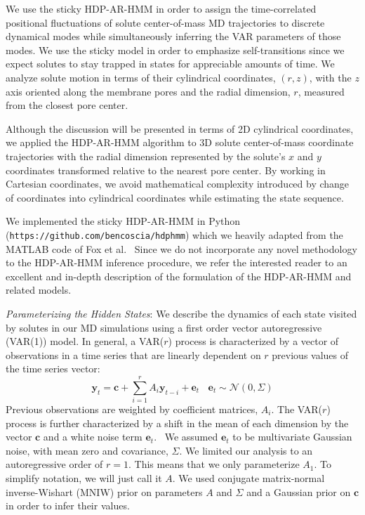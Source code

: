 \documentclass[journal=jpcbfk,manuscript=article]{achemso}
\begin{document}
  We use the sticky HDP-AR-HMM in order to assign the time-correlated positional 
  fluctuations of solute center-of-mass MD trajectories to discrete dynamical modes while 
  simultaneously inferring the VAR parameters of those modes. We use the sticky model
  in order to emphasize self-transitions since we expect solutes to stay trapped in
  states for appreciable amounts of time. We analyze solute motion in terms of their
  cylindrical coordinates, $(r, z)$, with the $z$ axis oriented along the membrane 
  pores and the radial dimension, $r$, measured from the closest pore center. 
  
  Although the discussion will be presented in terms of 2D cylindrical coordinates, we
  applied the HDP-AR-HMM algorithm to 3D solute center-of-mass coordinate trajectories 
  with the radial dimension represented by the solute's $x$ and $y$ coordinates 
  transformed relative to the nearest pore center. By working in Cartesian coordinates,
  we avoid mathematical complexity introduced by change of coordinates into cylindrical
  coordinates while estimating the state sequence.
  
  We implemented the sticky HDP-AR-HMM in Python 
  (\texttt{https://github.com/bencoscia/hdphmm}) which we heavily adapted from
  the MATLAB code of Fox et al.~\cite{fox_nonparametric_2009} Since we do not incorporate
  any novel methodology to the HDP-AR-HMM inference procedure, we refer the 
  interested reader to an excellent and in-depth description of the formulation of
  the HDP-AR-HMM and related models.~\cite{fox_bayesian_2010}
  
  \textit{Parameterizing the Hidden States}: We describe the dynamics of each 
  state visited by solutes in our MD simulations using a first order vector 
  autoregressive (VAR(1)) model. In general, a VAR($r$) process is characterized by a
  vector of observations in a time series that are linearly dependent on $r$ previous
  values of the time series vector:
  \begin{equation}
  	\mathbf{y}_t = \mathbf{c} + \sum_{i=1}^r A_i\mathbf{y}_{t-i} + \mathbf{e}_t~~~~\mathbf{e}_t \sim \mathcal{N}(0, \Sigma)
  \label{eqn:var}
  \end{equation}
  Previous observations are weighted by coefficient matrices, $A_i$. The VAR($r$) 
  process is further characterized by a shift in the mean of each dimension by the
  vector $\mathbf{c}$ and a white noise term $\mathbf{e}_t$.~\cite{hamilton_time_1994}
  We assumed $\mathbf{e}_t$ to be multivariate Gaussian noise, with mean zero and
  covariance, $\Sigma$. We limited our analysis to an autoregressive order of $r=1$.
  This means that we only parameterize $A_1$. To simplify notation, we will just
  call it $A$. We used conjugate matrix-normal inverse-Wishart (MNIW) prior on parameters 
  $A$ and $\Sigma$ and a Gaussian prior on $\mathbf{c}$ in order to infer their 
  values.~\cite{fox_nonparametric_2009}
   
\end{document}
